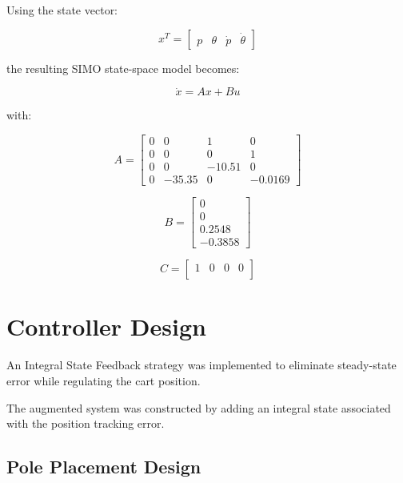 \documentclass[journal,twocolumn]{IEEEtran}
\begin{document}
Using the state vector:

\begin{equation}
x^T=
\begin{bmatrix}
p & \theta & \dot{p} & \dot{\theta}
\end{bmatrix}
\end{equation}

the resulting SIMO state-space model becomes:

\begin{equation}
\dot{x}=Ax+Bu
\end{equation}

with:

\begin{equation}
A =
\begin{bmatrix}
0 & 0 & 1 & 0 \\
0 & 0 & 0 & 1 \\
0 & 0 & -10.51 & 0 \\
0 & -35.35 & 0 & -0.0169
\end{bmatrix}
\end{equation}

\begin{equation}
B =
\begin{bmatrix}
0 \\
0 \\
0.2548 \\
-0.3858
\end{bmatrix}
\end{equation}

\begin{equation}
C =
\begin{bmatrix}
1 & 0 & 0 & 0 \\
\end{bmatrix}
\end{equation}

\section{Controller Design}

An Integral State Feedback strategy was implemented to
eliminate steady-state error while regulating the cart
position.

The augmented system was constructed by adding an
integral state associated with the position tracking error.

\subsection{Pole Placement Design}
\end{document}
